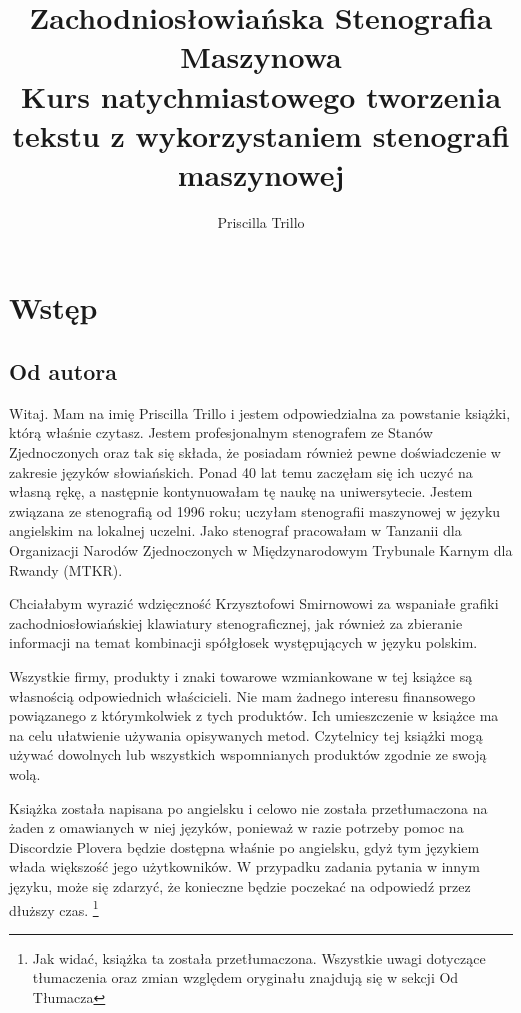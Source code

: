 \documentclass[12p, oneside]{book}
\begin{document}
\frontmatter

\title{Zachodniosłowiańska Stenografia Maszynowa\\ 
\normalsize Kurs natychmiastowego tworzenia tekstu z wykorzystaniem stenografi maszynowej}

\author{Priscilla Trillo}
\maketitle
\newpage


\tableofcontents

\chapter{Wstęp}

\section{Od autora}
Witaj. Mam na imię Priscilla Trillo i jestem odpowiedzialna za powstanie książki, którą właśnie czytasz. Jestem profesjonalnym stenografem ze Stanów Zjednoczonych oraz tak się składa, że posiadam również pewne doświadczenie w zakresie języków słowiańskich. Ponad 40 lat temu zaczęłam się ich uczyć na własną rękę, a następnie kontynuowałam tę naukę na uniwersytecie. Jestem związana ze stenografią od 1996 roku; uczyłam stenografii maszynowej w języku angielskim na lokalnej uczelni. Jako stenograf pracowałam w Tanzanii dla Organizacji Narodów Zjednoczonych w Międzynarodowym Trybunale Karnym dla Rwandy (MTKR).

Chciałabym wyrazić wdzięczność Krzysztofowi Smirnowowi za wspaniałe grafiki zachodniosłowiańskiej klawiatury stenograficznej, jak również za zbieranie informacji na temat kombinacji spółgłosek występujących w języku polskim.

Wszystkie firmy, produkty i znaki towarowe wzmiankowane w tej książce są własnością odpowiednich właścicieli. Nie mam żadnego interesu finansowego powiązanego z którymkolwiek z tych produktów. Ich umieszczenie w książce ma na celu ułatwienie używania opisywanych metod. Czytelnicy tej książki mogą używać dowolnych lub wszystkich wspomnianych produktów zgodnie ze swoją wolą.

Książka została napisana po angielsku i celowo nie została przetłumaczona na żaden z omawianych w niej języków, ponieważ w razie potrzeby pomoc na Discordzie Plovera będzie dostępna właśnie po angielsku, gdyż tym językiem włada większość jego użytkowników. W przypadku zadania pytania w innym języku, może się zdarzyć, że konieczne będzie poczekać na odpowiedź przez dłuższy czas. \footnote{Jak widać, książka ta została przetłumaczona. Wszystkie uwagi dotyczące tłumaczenia oraz zmian względem oryginału znajdują się w sekcji Od Tłumacza}
\end{document}
